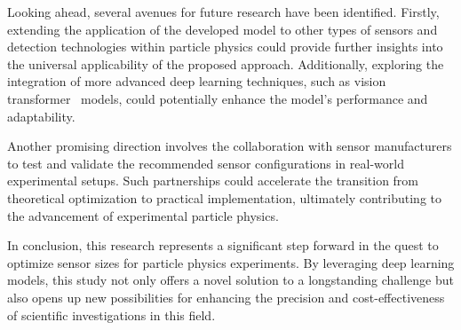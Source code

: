 \documentclass[conference]{IEEEtran}
\begin{document}
Looking ahead, several avenues for future research have been identified. Firstly, extending the application of the developed model to other types of sensors and detection technologies within particle physics could provide further insights into the universal applicability of the proposed approach. Additionally, exploring the integration of more advanced deep learning techniques, such as vision transformer~\cite{dosovitskiy2021image} models, could potentially enhance the model's performance and adaptability.

Another promising direction involves the collaboration with sensor manufacturers to test and validate the recommended sensor configurations in real-world experimental setups. Such partnerships could accelerate the transition from theoretical optimization to practical implementation, ultimately contributing to the advancement of experimental particle physics.

In conclusion, this research represents a significant step forward in the quest to optimize sensor sizes for particle physics experiments. By leveraging deep learning models, this study not only offers a novel solution to a longstanding challenge but also opens up new possibilities for enhancing the precision and cost-effectiveness of scientific investigations in this field.



\end{document}
